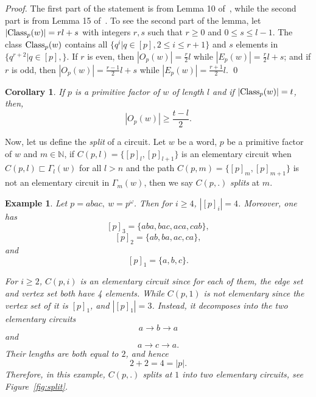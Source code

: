 \documentclass[runningheads,envcountsame,a4paper]{llncs}
\newtheorem{cor}[thm]{Corollary}
\newtheorem{exa}[thm]{Example}
\newcommand{\Class}{\hbox{\rm Class}}
\newcommand{\N}{\mathbb N}
\begin{document}
\begin{proof}
The first part of the statement is from Lemma 10 of~\cite{power}, while the second part is from Lemma 15 of~\cite{word23}. To see the second part of the lemma, let $|\Class_p(w)|=rl+s$ with integers $r,s$ such that $r \geq 0$ and $0 \leq s \leq l-1$. The class $\Class_p(w)$ contains all $\{q^i| q \in [p], 2 \leq i \leq r+1\}$ and $s$ elements in $\{q^{r+2}| q \in [p],\}$.  If $r$ is even, then $|O_p(w)|=\frac{r}{2}l$ while $|E_p(w)|=\frac{r}{2}l+s$; and if $r$ is odd, then $|O_p(w)|=\frac{r-1}{2}l+s$ while $|E_p(w)|=\frac{r+1}{2}l$. \qed
\end{proof}

\begin{cor}\label{inj}
If $p$ is a primitive factor of $w$ of length $l$ and if $|\Class_p(w)|=t$, then, 
$$|O_p(w)| \geq \frac{t-l}{2}.$$
\end{cor}

Now, let us define the {\em split} of a circuit. Let $w$ be a word, $p$ be a primitive factor of $w$ and $m \in \N$, if $C(p,l)=\{[p]_{l},[p]_{l+1}\}$ is an elementary circuit when $C(p,l) \sqsubset \Gamma_l(w)$ for all $l >n$ and the path $C(p,m)=\{[p]_{m},[p]_{m+1}\}$ is not an elementary circuit in $\Gamma_m(w)$, then we say $C(p,.)$ {\em splits} at $m$. 

\begin{exa}
    
Let $p=abac,\ w=p^{\omega}$. Then for $i\ge 4$, $|[p]_i|=4$. Moreover, one has
\[
        [p]_3=\{aba,bac,aca,cab\},
\]
\[
        [p]_2=\{ab,ba,ac,ca\},
\]
and
\[
        [p]_1=\{a,b,c\}.
\]

For $i\ge 2$, $C(p,i)$ is an elementary circuit since for each of them, the edge set and vertex set both have 4 elements. While $C(p,1)$ is not elementary since the vertex set of it is $[p]_1$, and $|[p]_1|=3$. Instead, it decomposes into the two elementary circuits
\[
        a\to b\to a
\]
and
\[
        a\to c\to a.
\]
Their lengths are both equal to $2$, and hence
\[
        2+2=4=|p|.
\]
Therefore, in this example, $C(p,.)$ splits at
$1$ into two elementary circuits, see Figure~\ref{fig:split}.

\end{exa}
\end{document}

